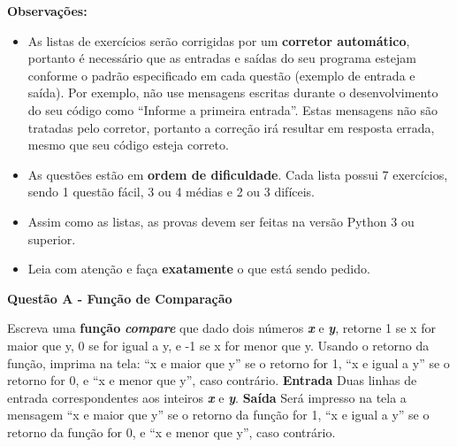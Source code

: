 \documentclass[a4paper, 12pt]{article}
\begin{document}
\textbf{{\large Observações:}}
\begin{itemize}
	\item As listas de exercícios serão corrigidas por um \textbf{corretor automático}, portanto é necessário que as entradas e saídas do seu programa estejam conforme o padrão especificado em cada questão (exemplo de entrada e saída). Por exemplo, não use mensagens escritas durante o desenvolvimento do seu código como ``Informe a primeira entrada''. Estas mensagens não são tratadas pelo corretor, portanto a correção irá resultar em resposta errada, mesmo que seu código esteja correto.
	\item As questões estão em \textbf{ordem de dificuldade}. Cada lista possui 7 exercícios, sendo 1 questão fácil, 3 ou 4 médias e 2 ou 3 difíceis.
	\item Assim como as listas, as provas devem ser feitas na versão Python 3 ou superior.
	\item Leia com atenção e faça \textbf{exatamente} o que está sendo pedido.
\end{itemize}
\newpage %
\begin{center}
\textbf{{\Large Questão A - Função de Comparação}}
\end{center}
\vspace{5pt}
Escreva uma \textbf{função} \textbf{\textit{compare}} que dado dois números \textbf{\textit{x}} e \textbf{\textit{y}}, retorne 1 se x for maior que y, 0 se for igual a y, e -1 se x for menor que y. Usando o retorno da função, imprima na tela: ``x e maior que y'' se o retorno for 1, ``x e igual a y'' se o retorno for 0, e ``x e menor que y'', caso contrário.
\newline \newline
\textbf{{\large Entrada}} \newline
Duas linhas de entrada correspondentes aos inteiros \textbf{\textit{x}} e \textbf{\textit{y}}.
\newline \newline
\textbf{{\large Saída}} \newline
Será impresso na tela a mensagem ``x e maior que y'' se o retorno da função for 1, ``x e igual a y'' se o retorno da função for 0, e ``x e menor que y'', caso contrário.
\newline
\end{document}
